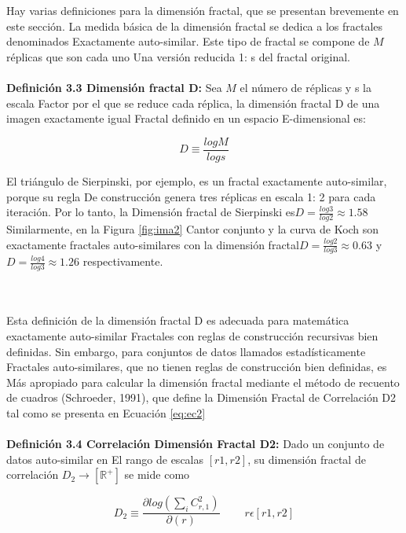 \\\\
Hay varias definiciones para la dimensión fractal, que se presentan brevemente en este
sección. La medida básica de la dimensión fractal se dedica a los fractales denominados
Exactamente auto-similar. Este tipo de fractal se compone de $M$ réplicas que son cada uno
Una versión reducida 1: s del fractal original.
\\\\
\textbf{Definición 3.3 Dimensión fractal D:} Sea $M$ el número de réplicas y s la escala
Factor por el que se reduce cada réplica, la dimensión fractal D de una imagen exactamente igual Fractal definido en un espacio E-dimensional es:

\begin{equation}
D \equiv \frac{logM}{logs}
\label{eq:ec1}
\end{equation}

El triángulo de Sierpinski, por ejemplo, es un fractal exactamente auto-similar, porque su regla
De construcción genera tres réplicas en escala 1: 2 para cada iteración. Por lo tanto, la
Dimensión fractal de Sierpinski es$ D = \frac{log3}{log2} \approx 1.58$ Similarmente, en la Figura \ref{fig:ima2}
Cantor conjunto y la curva de Koch son exactamente fractales auto-similares con la dimensión fractal$ D = \frac{log2}{log3} \approx 0.63$ y $ D = \frac{log4}{log3} \approx 1.26$ respectivamente.

\\\\
Esta definición de la dimensión fractal D es adecuada para matemática exactamente auto-similar
Fractales con reglas de construcción recursivas bien definidas. Sin embargo, para conjuntos de datos llamados estadísticamente
Fractales auto-similares, que no tienen reglas de construcción bien definidas, es
Más apropiado para calcular la dimensión fractal mediante el método de recuento de cuadros
(Schroeder, 1991), que define la Dimensión Fractal de Correlación D2 tal como se presenta en
Ecuación \ref{eq:ec2}
\\\\

\textbf{Definición 3.4 Correlación Dimensión Fractal D2:} Dado un conjunto de datos auto-similar en
El rango de escalas $[r1, r2]$, su dimensión fractal de correlación $D_2 \rightarrow \left[ \mathbb{R}^{+} \right]$ se mide como

\begin{equation}
D_2 \equiv  \frac{\partial log (\sum_i C_{r,1}^2)}{\partial (r)} \qquad \:r \epsilon [r1,r2 ]
\label{eq:ec2}
\end{equation}

